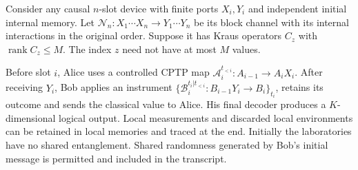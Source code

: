 \documentclass[11pt]{article}
\newcommand{\rank}{\operatorname{rank}}
\newcommand{\cN}{\mathcal N}
\begin{document}
Consider any causal $n$-slot device with finite ports $X_i,Y_i$ and independent initial internal memory. Let $\cN_n:X_1\cdots X_n\to Y_1\cdots Y_n$ be its block channel with its internal interactions in the original order. Suppose it has Kraus operators $C_z$ with $\rank C_z\le M$. The index $z$ need not have at most $M$ values.

Before slot $i$, Alice uses a controlled CPTP map
$\mathcal A_i^{t_{<i}}:A_{i-1}\to A_iX_i$.
After receiving $Y_i$, Bob applies an instrument
$\{\mathcal B_i^{t_i|t_{<i}}:B_{i-1}Y_i\to B_i\}_{t_i}$,
retains its outcome and sends the classical value to Alice. His final decoder produces a $K$-dimensional logical output. Local measurements and discarded local environments can be retained in local memories and traced at the end. Initially the laboratories have no shared entanglement. Shared randomness generated by Bob's initial message is permitted and included in the transcript.
\end{document}
